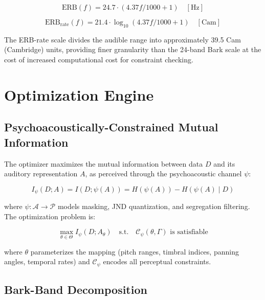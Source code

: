 \documentclass[sigchi, nonacm]{acmart}
\begin{document}
\begin{equation}
\mathrm{ERB}(f) = 24.7 \cdot (4.37 f / 1000 + 1) \quad [\mathrm{Hz}]
\end{equation}

\begin{equation}
\mathrm{ERB}_\mathrm{rate}(f) = 21.4 \cdot \log_{10}(4.37 f / 1000 + 1) \quad [\mathrm{Cam}]
\end{equation}

The ERB-rate scale divides the audible range into approximately 39.5 Cam (Cambridge) units, providing finer granularity than the 24-band Bark scale at the cost of increased computational cost for constraint checking.

\section{Optimization Engine}
\label{sec:optimizer}

\subsection{Psychoacoustically-Constrained Mutual Information}

The optimizer maximizes the mutual information between data $D$ and its auditory representation $A$, as perceived through the psychoacoustic channel $\psi$:

\begin{equation}
I_\psi(D; A) = I(D; \psi(A)) = H(\psi(A)) - H(\psi(A) \mid D)
\label{eq:ipsi}
\end{equation}

where $\psi: \mathcal{A} \to \mathcal{P}$ models masking, JND quantization, and segregation filtering. The optimization problem is:

\begin{equation}
\max_{\theta \in \Theta} I_\psi(D; A_\theta) \quad \text{s.t.} \quad \mathcal{C}_\psi(\theta, \Gamma) \text{ is satisfiable}
\end{equation}

where $\theta$ parameterizes the mapping (pitch ranges, timbral indices, panning angles, temporal rates) and $\mathcal{C}_\psi$ encodes all perceptual constraints.

\subsection{Bark-Band Decomposition}
\end{document}
